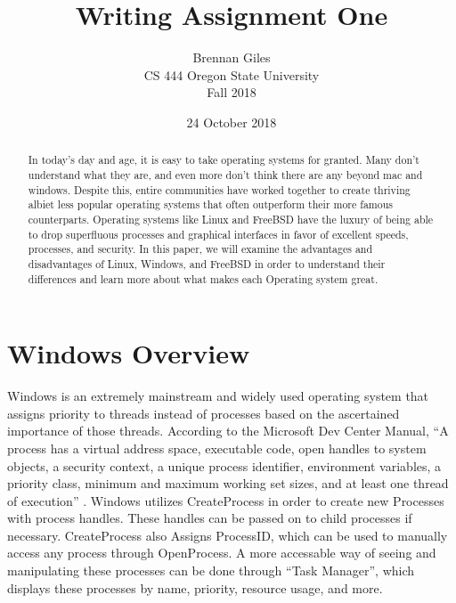 \documentclass[onecolumn, draftclsnofoot,10pt, compsoc]{IEEEtran}
\title{Writing Assignment One}
\author{Brennan Giles\\CS 444 Oregon State University\\Fall 2018}
\date {24 October 2018}
\begin{document}
\begin{titlepage}
	\maketitle
    \begin{singlespace}
        \begin{abstract}
		In today’s day and age, it is easy to take operating systems for granted. Many don’t understand what they are, and even more don’t think there are any beyond mac and windows. Despite this, entire communities have worked together to create thriving albiet less popular operating systems that often outperform their more famous counterparts. Operating systems like Linux and FreeBSD have the luxury of being able to drop superfluous processes and graphical interfaces in favor of excellent speeds, processes, and security. In this paper, we will examine the advantages and disadvantages of Linux, Windows, and FreeBSD in order to understand their differences and learn more about what makes each Operating system great.
        	
        \end{abstract}     
    \end{singlespace}
\end{titlepage}
\newpage
{}

\clearpage

\section{Windows Overview}
Windows is an extremely mainstream and widely used operating system that assigns priority to threads instead of processes based on the ascertained importance of those threads. According to the Microsoft Dev Center Manual, “A process has a virtual address space, executable code, open handles to system objects, a security context, a unique process identifier, environment variables, a priority class, minimum and maximum working set sizes, and at least one thread of execution” \cite{WindowsDev}. Windows utilizes CreateProcess in order to create new Processes with process handles. These handles can be passed on to child processes if necessary. CreateProcess also Assigns ProcessID, which can be used to manually access any process through OpenProcess. A more accessable way of seeing and manipulating these processes can be done through “Task Manager”, which displays these processes by name, priority, resource usage, and more. \\
\end{document}
